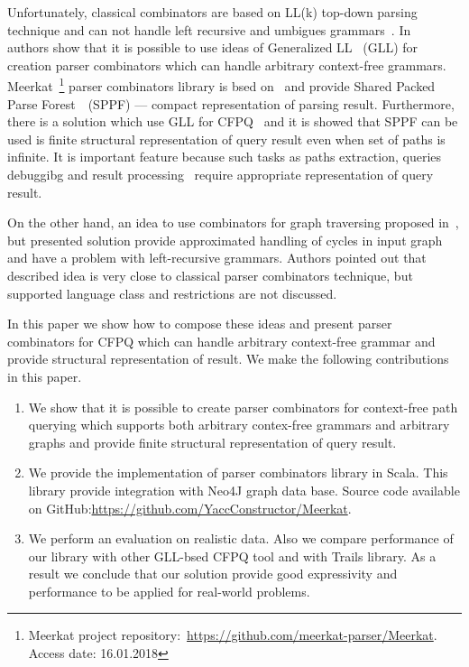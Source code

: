 Unfortunately, classical combinators are based on LL(k) top-down parsing technique and can not handle left recursive and umbigues grammars~\cite{!!!}.
In~\cite{Meerkat} authors show that it is possible to use ideas of Generalized LL~\cite{scott2010gll} (GLL) for creation parser combinators which can handle arbitrary context-free grammars.
Meerkat~\footnote{Meerkat project repository:~\url{https://github.com/meerkat-parser/Meerkat}. Access date: 16.01.2018} parser combinators library is bsed on~\cite{Meerkat} and provide Shared Packed Parse Forest~\cite{SPPF}~(SPPF) --- compact representation of parsing result. 
Furthermore, there is a solution which use GLL for CFPQ~\cite{GrigorevR16} and it is showed that SPPF can be used is finite structural representation of query result even when set of paths is infinite.
It is important feature because such tasks as paths extraction, queries debuggibg and result processing~\cite{structForDebugging} require appropriate representation of query result.

On the other hand, an idea to use combinators for graph traversing proposed in~\cite{ScalaGraphParsing}, but presented solution provide approximated handling of cycles in input graph and have a problem with left-recursive grammars. 
Authors pointed out that described idea is very close to classical parser combinators technique, but supported language class and restrictions are not discussed.

In this paper we show how to compose these ideas and present parser combinators for CFPQ which can handle arbitrary context-free grammar and provide structural representation of result.
We make the following contributions in this paper.

\begin{enumerate}
\item We show that it is possible to create parser combinators for context-free path querying which supports both arbitrary contex-free grammars and arbitrary graphs and provide finite structural representation of query result.
\item We provide the implementation of parser combinators library in Scala. This library provide integration with Neo4J graph data base. Source code available on GitHub:\url{https://github.com/YaccConstructor/Meerkat}.
\item We perform an evaluation on realistic data. 
Also we compare performance of our library with other GLL-bsed CFPQ tool and with Trails library.
As a result we conclude that our solution provide good expressivity and performance to be applied for real-world problems. 
\end{enumerate}